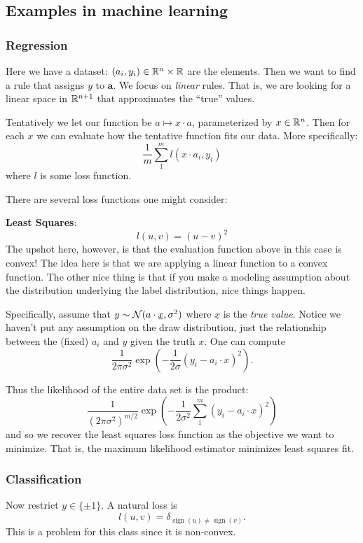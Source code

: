 \documentclass[12pt]{article}
\begin{document}
\subsection{Examples in machine learning}
\subsubsection{Regression}
Here we have a dataset: $(a_i,y_i)\in\mathbb{R}^n\times\mathbb{R}$ are the elements. Then we want to find a rule that assigns $y$ to $\mathbf a$. We focus on \textit{linear} rules.
That is, we are looking for a linear space in $\mathbb{R}^{n+1}$ that approximates the ``true'' values.

Tentatively we let our function be $a\mapsto x\cdot a$, parameterized by $x\in\mathbb{R}^n$. Then for each $x$ we can evaluate how the tentative function
fits our data. More specifically:
\[\frac{1}{m}\sum_1^m l(x\cdot a_i,y_i)\]
where $l$ is some loss function.

There are several loss functions one might consider:

\noindent\textbf{Least Squares}: 
\[l(u,v)=(u-v)^2\] 
The upshot here, however, is that the evaluation function above in this case is convex!
The idea here is that we are applying a linear function to a convex function. The other nice thing is that if you make a modeling assumption about the 
distribution underlying the label distribution, nice things happen.

Specifically, assume that $y\sim\mathcal{N}(a\cdot \underline x,\sigma^2)$ where $\underline x$ is the \textit{true value}.
Notice we haven't put any assumption on the draw distribution, just the relationship between the (fixed) $a_i$ and $y$ given the truth $x$. One can compute 
\[\frac{1}{2\pi\sigma^2}\exp(-\frac{1}{2\sigma}(y_i-a_i\cdot x)^2).\]

Thus the likelihood of the entire data set is the product:
\[\frac{1}{(2\pi\sigma^2)^{m/2}}\exp(-\frac{1}{2\sigma^2}\sum_1^m(y_i-a_i\cdot x)^2)\]
and so we recover the least squares loss function as the objective we want to minimize. That is, the maximum likelihood estimator minimizes least squares fit.

\subsubsection{Classification}
Now restrict $y\in\{\pm 1\}$. A natural loss is 
\[l(u,v)=\delta_{\operatorname{sign}(u)\ne\operatorname{sign}(v)}.\]
This is a problem for this class since it is non-convex.
\end{document}
